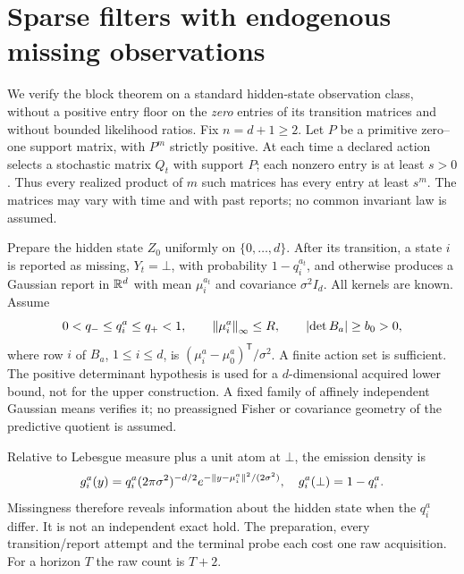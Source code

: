 \section{Sparse filters with endogenous missing observations}\label{sec:filters}
We verify the block theorem on a standard hidden-state observation class, without a positive entry floor on the \emph{zero} entries of its transition matrices and without bounded likelihood ratios. Fix $n=d+1\ge2$. Let $P$ be a primitive zero--one support matrix, with $P^m$ strictly positive. At each time a declared action selects a stochastic matrix $Q_t$ with support $P$; each nonzero entry is at least $s>0$. Thus every realized product of $m$ such matrices has every entry at least $s^m$. The matrices may vary with time and with past reports; no common invariant law is assumed.

Prepare the hidden state $Z_0$ uniformly on $\{0,\ldots,d\}$. After its transition, a state $i$ is reported as missing, $Y_t=\bot$, with probability $1-q_i^{a_t}$, and otherwise produces a Gaussian report in $\mathbb R^d$ with mean $\mu_i^{a_t}$ and covariance $\sigma^2I_d$. All kernels are known. Assume
\begin{equation}\label{eq:hmmparams}
 0<q_-\le q_i^a\le q_+<1,\qquad
 \left\lVert\mu_i^a\right\rVert_\infty\le R,
 \qquad \left\lvert\det B_a\right\rvert\ge b_0>0,
\end{equation}
where row $i$ of $B_a$, $1\le i\le d$, is $(\mu_i^a-\mu_0^a)^{\mathsf T}/\sigma^2$. A finite action set is sufficient. The positive determinant hypothesis is used for a $d$-dimensional acquired lower bound, not for the upper construction. A fixed family of affinely independent Gaussian means verifies it; no preassigned Fisher or covariance geometry of the predictive quotient is assumed.

Relative to Lebesgue measure plus a unit atom at $\bot$, the emission density is
\begin{equation}\label{eq:emissions}
 g_i^a(y)=q_i^a(2\pi\sigma^2)^{-d/2}
 e^{-\left\lVert y-\mu_i^a\right\rVert^2/(2\sigma^2)},\quad
 g_i^a(\bot)=1-q_i^a.
\end{equation}
Missingness therefore reveals information about the hidden state when the $q_i^a$ differ. It is not an independent exact hold. The preparation, every transition/report attempt and the terminal probe each cost one raw acquisition. For a horizon $T$ the raw count is $T+2$.

